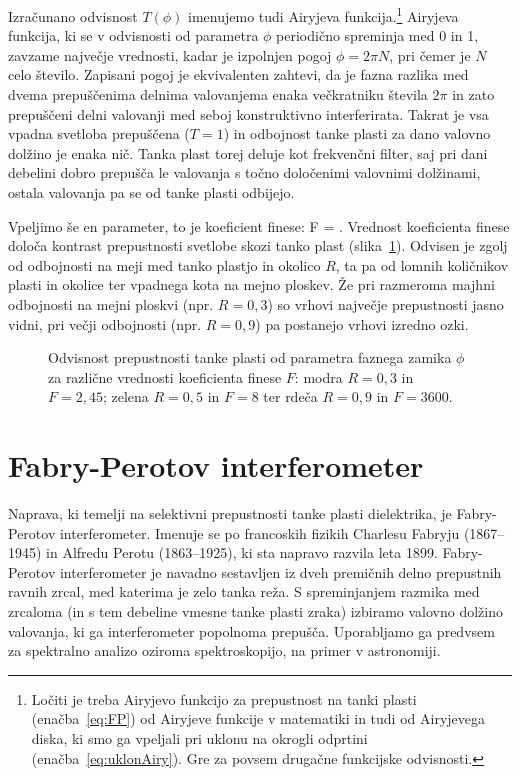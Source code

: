 Izračunano odvisnost $T(\phi)$ imenujemo tudi Airyjeva
funkcija.\footnote{Ločiti je treba Airyjevo funkcijo za prepustnost 
na tanki plasti (enačba~\ref{eq:FP}) od Airyjeve funkcije v matematiki in tudi 
od Airyjevega diska, ki smo ga vpeljali pri uklonu na okrogli odprtini 
(enačba~\ref{eq:uklonAiry}). Gre za povsem drugačne funkcijske odvisnosti.}
Airyjeva funkcija, ki se v odvisnosti od parametra $\phi$ periodično spreminja
med 0 in 1, zavzame največje vrednosti, kadar je izpolnjen pogoj $\phi = 2 \pi N$, 
pri čemer je $N$ celo število. Zapisani pogoj je ekvivalenten zahtevi, da je  
fazna razlika med dvema prepuščenima delnima valovanjema enaka večkratniku 
števila $2\pi$ in zato prepuščeni delni valovanji med seboj konstruktivno 
interferirata. Takrat je vsa vpadna svetloba prepuščena ($T=1$) in 
odbojnost tanke plasti za dano valovno dolžino je enaka nič. Tanka plast torej 
deluje kot frekvenčni filter, saj pri dani debelini dobro prepušča le valovanja
s točno določenimi valovnimi dolžinami, ostala valovanja pa se od tanke plasti 
odbijejo.

Vpeljimo še en parameter, to je koeficient finese:
\beq
F = .
\label{eq:06_44}
\eeq
Vrednost koeficienta finese določa kontrast prepustnosti svetlobe skozi tanko
plast (slika~\ref{fig:06_FP1}). Odvisen je zgolj od odbojnosti na meji
med tanko plastjo in okolico $R$, ta pa od lomnih količnikov plasti in okolice
ter vpadnega kota na mejno ploskev. Že pri razmeroma majhni odbojnosti na mejni
ploskvi (npr. $R=0,3$) so vrhovi največje prepustnosti jasno vidni, pri večji 
odbojnosti (npr. $R=0,9$) pa postanejo vrhovi izredno ozki.
\begin{figure}[ht]
\centering
\def\svgwidth{110truemm} 

\caption{Odvisnost prepustnosti tanke plasti od parametra faznega zamika $\phi$
za različne vrednosti koeficienta finese $F$: modra $R = 0,3$ in $F=2,45$; 
zelena $R=0,5$ in $F=8$ ter rdeča $R=0,9$ in $F=3600$.}
\label{fig:06_FP1}
\end{figure}

\section{Fabry-Perotov interferometer}
Naprava, ki temelji na selektivni prepustnosti tanke plasti dielektrika, je 
Fabry-Perotov interferometer. Imenuje se po francoskih fizikih Charlesu Fabryju (1867--1945)
in Alfredu Perotu (1863--1925), ki sta napravo razvila leta 1899. Fabry-Perotov interferometer
je navadno sestavljen iz dveh premičnih delno prepustnih ravnih zrcal, med katerima
je zelo tanka reža. S spreminjanjem razmika med zrcaloma (in s tem debeline vmesne tanke
plasti zraka) izbiramo valovno dolžino
valovanja, ki ga interferometer popolnoma prepušča. Uporabljamo ga predvsem
za spektralno analizo oziroma spektroskopijo, na primer v astronomiji. 

